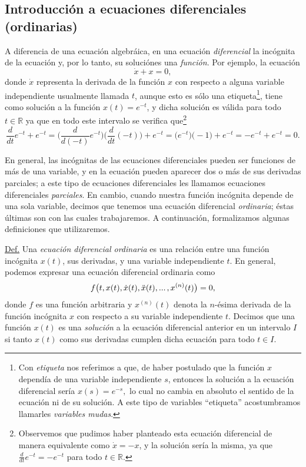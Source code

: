 \documentclass[12pt,dvipsnames]{article}
\begin{document}
\newpage
\subsection{Introducción a ecuaciones diferenciales (ordinarias)} \label{Subsec:Introducción a ecuaciones diferenciales ordinarias}

A diferencia de una ecuación algebráica, en una ecuación \emph{diferencial} la incógnita de la ecuación \textemdash y, por lo tanto, su solución\textemdash es una \emph{función}. Por ejemplo, la ecuación $$\dot{x} + x = 0,$$ donde $\dot{x}$ representa la derivada de la función $x$ con respecto a alguna variable independiente \textemdash usualmente llamada $t$, aunque esto es sólo una etiqueta\footnote{Con \emph{etiqueta} nos referimos a que, de haber postulado que la función $x$ dependía de una variable independiente $s$, entonces la solución a la ecuación diferencial sería $x(s)=e^{-s},$ lo cual no cambia en absoluto el sentido de la ecuación ni de su solución. A este tipo de variables ``etiqueta'' acostumbramos llamarles \emph{variables mudas}.}\textemdash, tiene como solución a la función $x(t)=e^{-t}$, y dicha solución es válida para todo $t\in\mathbb{R}$ ya que en todo este intervalo se verifica que\footnote{Observemos que pudimos haber planteado esta ecuación diferencial de manera equivalente como $\dot{x}=-x$, y la solución sería la misma, ya que $\frac{d}{dt}e^{-t}=-e^{-t}$ para todo $t\in\mathbb{R}$.} $$\frac{d }{dt}e^{-t} + e^{-t} = \bigg(\frac{d}{d(-t)}e^{-t}\bigg)\bigg(\frac{d }{dt}(-t)\bigg) + e^{-t} = \big(e^{-t}\big)\big(-1\big)+e^{-t} = -e^{-t}+e^{-t}= 0.$$

\vspace{3mm}
En general, las incógnitas de las ecuaciones diferenciales pueden ser funciones de más de una variable, y en la ecuación pueden aparecer dos o más de sus derivadas parciales; a este tipo de ecuaciones diferenciales les llamamos ecuaciones diferenciales \emph{parciales}. En cambio, cuando nuestra función incógnita depende de una sola variable, decimos que tenemos una ecuación diferencial \emph{ordinaria}; éstas últimas son con las cuales trabajaremos. A continuación, formalizamos algunas definiciones que utilizaremos.

\vspace{3mm}
\begin{tcolorbox}
\underline{Def.} Una \emph{ecuación diferencial ordinaria} es una relación entre una función incógnita $x(t)$, sus derivadas, y una variable independiente $t$. En general, podemos expresar una ecuación diferencial ordinaria como $$f\big(t,x(t),\dot{x}(t),\ddot{x}(t),...\hspace{0.5mm},x^{(n)}(t)\big)=0,$$ donde $f$ es una función arbitraria y $x^{(n)}(t)$ denota la $n$-ésima derivada de la función incógnita $x$ con respecto a su variable independiente $t$. Decimos que una función $x(t)$ es una \emph{solución} a la ecuación diferencial anterior en un intervalo $I$ si tanto $x(t)$ como sus derivadas cumplen dicha ecuación para todo $t\in I$.
\end{tcolorbox}
\end{document}
